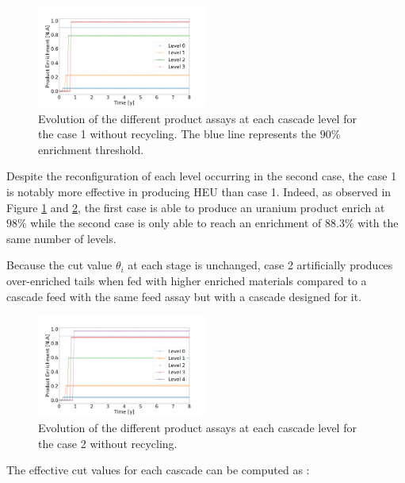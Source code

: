 \documentclass{anstrans}
\begin{document}
\begin{figure}[ht] %
  \centering
  \includegraphics[width=0.5\textwidth]{assay_case_1_no_rec.png}
  \caption{Evolution of the different product assays at each cascade level for
  the case 1 without recycling. The blue line represents the $90\%$ enrichment
  threshold.}\label{fig:assay_c1_nr}
\end{figure}
Despite the reconfiguration of each level occurring in the second case, the case
1 is notably more effective in producing HEU than case 1. Indeed, as observed in
Figure \ref{fig:assay_c1_nr} and \ref{fig:assay_c2_nr}, the first case is able
to produce an uranium product enrich at $98\%$ while the second case is only
able to reach an enrichment of $88.3\%$ with the same number of levels.


Because the cut value $\theta_i$ at each stage is unchanged, case 2 artificially
produces over-enriched tails when fed with higher enriched materials compared
to a cascade feed with the same feed assay but with a cascade designed for it.
\begin{figure}[ht] %
  \centering
  \includegraphics[width=0.5\textwidth]{assay_case_2_no_rec.png}
  \caption{Evolution of the different product assays at each cascade level for
  the case 2 without recycling. }\label{fig:assay_c2_nr}
\end{figure}


The effective cut values for each cascade can be computed as :
\end{document}

